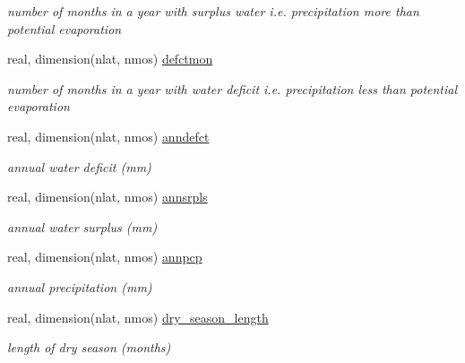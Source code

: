 \begin{DoxyCompactItemize}
\begin{DoxyCompactList}\small\item\em number of months in a year with surplus water i.\+e. precipitation more than potential evaporation \end{DoxyCompactList}\item 
\hypertarget{structctem__statevars_1_1veg__rot_ab9bc71b3863d6336736fd28e18caed2b}{}real, dimension(nlat, nmos) \hyperlink{structctem__statevars_1_1veg__rot_ab9bc71b3863d6336736fd28e18caed2b}{defctmon}\label{structctem__statevars_1_1veg__rot_ab9bc71b3863d6336736fd28e18caed2b}

\begin{DoxyCompactList}\small\item\em number of months in a year with water deficit i.\+e. precipitation less than potential evaporation \end{DoxyCompactList}\item 
\hypertarget{structctem__statevars_1_1veg__rot_a71bdbd015fa70ebf97e4732ec0bf0b80}{}real, dimension(nlat, nmos) \hyperlink{structctem__statevars_1_1veg__rot_a71bdbd015fa70ebf97e4732ec0bf0b80}{anndefct}\label{structctem__statevars_1_1veg__rot_a71bdbd015fa70ebf97e4732ec0bf0b80}

\begin{DoxyCompactList}\small\item\em annual water deficit (mm) \end{DoxyCompactList}\item 
\hypertarget{structctem__statevars_1_1veg__rot_a3aab440add68ccbda6cda9514827452e}{}real, dimension(nlat, nmos) \hyperlink{structctem__statevars_1_1veg__rot_a3aab440add68ccbda6cda9514827452e}{annsrpls}\label{structctem__statevars_1_1veg__rot_a3aab440add68ccbda6cda9514827452e}

\begin{DoxyCompactList}\small\item\em annual water surplus (mm) \end{DoxyCompactList}\item 
\hypertarget{structctem__statevars_1_1veg__rot_a33d8786af675b3730ad9137c6ce77d74}{}real, dimension(nlat, nmos) \hyperlink{structctem__statevars_1_1veg__rot_a33d8786af675b3730ad9137c6ce77d74}{annpcp}\label{structctem__statevars_1_1veg__rot_a33d8786af675b3730ad9137c6ce77d74}

\begin{DoxyCompactList}\small\item\em annual precipitation (mm) \end{DoxyCompactList}\item 
\hypertarget{structctem__statevars_1_1veg__rot_a24757068deba766b0e5ffb542a467bd8}{}real, dimension(nlat, nmos) \hyperlink{structctem__statevars_1_1veg__rot_a24757068deba766b0e5ffb542a467bd8}{dry\+\_\+season\+\_\+length}\label{structctem__statevars_1_1veg__rot_a24757068deba766b0e5ffb542a467bd8}

\begin{DoxyCompactList}\small\item\em length of dry season (months) \end{DoxyCompactList}\end{DoxyCompactItemize}


